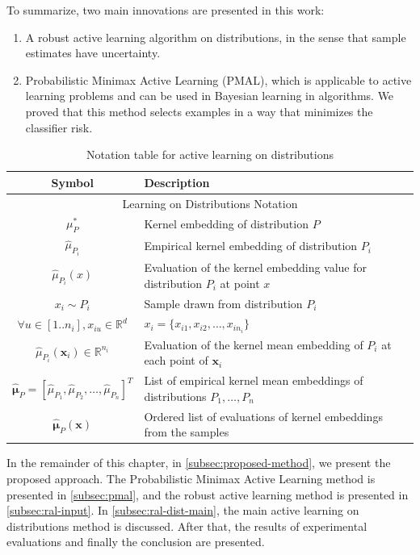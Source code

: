 \documentclass[12pt]{article}
\begin{document}
	To summarize, two main innovations are presented in this work:
	\begin{enumerate}
		\item A robust active learning algorithm on distributions, in the sense that sample estimates have uncertainty.
		\item Probabilistic Minimax Active Learning (PMAL), which is applicable to active learning problems and can be used in Bayesian learning in algorithms. We proved that this method selects examples in a way that minimizes the classifier risk.
	\end{enumerate}
	
	\begin{table}[h!]
		\centering
		\caption{Notation table for active learning on distributions}
		\label{tab:dist-al-notation}
		\begin{tabular}{c|l}
			\hline
			Symbol & Description \\
			\hline
			\multicolumn{2}{c}{Learning on Distributions Notation} \\
			\hline
			$\mu^*_P$ & Kernel embedding of distribution $P$ \\
			$\hat{\mu}_{P_i}$ & Empirical kernel embedding of distribution $P_i$ \\
			$\hat{\mu}_{P_i}(x)$ & Evaluation of the kernel embedding value for distribution $P_i$ at point $x$ \\
			$x_i \sim P_i$ & Sample drawn from distribution $P_i$ \\
			$\forall u \in [1..n_i], x_{iu} \in \mathbb{R}^d$ & $x_i = \{x_{i1}, x_{i2}, \ldots, x_{i n_i}\}$ \\
			$\hat{\mu}_{P_i}(\mathbf{x}_i) \in \mathbb{R}^{n_i}$ & Evaluation of the kernel mean embedding of $P_i$ at each point of $\mathbf{x}_i$ \\
			$\hat{\boldsymbol{\mu}}_P = [\hat{\mu}_{P_1}, \hat{\mu}_{P_2}, \ldots, \hat{\mu}_{P_n}]^T$ & List of empirical kernel mean embeddings of distributions $P_1, \ldots, P_n$ \\
			$\hat{\boldsymbol{\mu}}_P(\mathbf{x})$ & Ordered list of evaluations of kernel embeddings from the samples \\
			\hline
		\end{tabular}
	\end{table}
	
	In the remainder of this chapter, in \ref{subsec:proposed-method}, we present the proposed approach. The Probabilistic Minimax Active Learning method is presented in \ref{subsec:pmal}, and the robust active learning method is presented in \ref{subsec:ral-input}. In \ref{subsec:ral-dist-main}, the main active learning on distributions method is discussed. After that, the results of experimental evaluations and finally the conclusion are presented.
	
\end{document}
